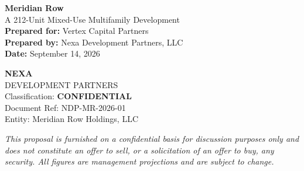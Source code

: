 \documentclass[11pt,letterpaper]{article}
\begin{document}
\thispagestyle{firstpage}

\begin{tcolorbox}[colback=jvnavy, colframe=jvnavy, arc=0mm, left=22pt, right=22pt,
  top=22pt, bottom=20pt, width=\linewidth]
  \noindent
  \begin{minipage}[t]{0.62\textwidth}
    {\fontsize{23pt}{27pt}\selectfont\sffamily\bfseries\color{white} Meridian Row}\\[4pt]
    {\fontsize{13pt}{16pt}\selectfont\sffamily\color{jvgold} A 212-Unit Mixed-Use Multifamily Development}\\[12pt]
    {\sffamily\small\color{white}\textbf{Prepared for:} Vertex Capital Partners}\\[2pt]
    {\sffamily\small\color{white}\textbf{Prepared by:} Nexa Development Partners, LLC}\\[2pt]
    {\sffamily\small\color{white}\textbf{Date:} September 14, 2026}
  \end{minipage}%
  \begin{minipage}[t]{0.36\textwidth}
    \raggedleft
    {\fontsize{20pt}{24pt}\selectfont\sffamily\bfseries\color{jvgold} NEXA}\\[-2pt]
    {\sffamily\small\color{white} DEVELOPMENT PARTNERS}\\[14pt]
    {\sffamily\scriptsize\color{white}
      Classification: \textbf{CONFIDENTIAL} \\
      Document Ref: NDP-MR-2026-01 \\
      Entity: Meridian Row Holdings, LLC
    }
  \end{minipage}
\end{tcolorbox}

\vspace{4pt}
{\scriptsize\sffamily\color{jvsage}\itshape
  This proposal is furnished on a confidential basis for discussion purposes only and does not
  constitute an offer to sell, or a solicitation of an offer to buy, any security. All figures
  are management projections and are subject to change.}

\vspace{12pt}











\end{document}
